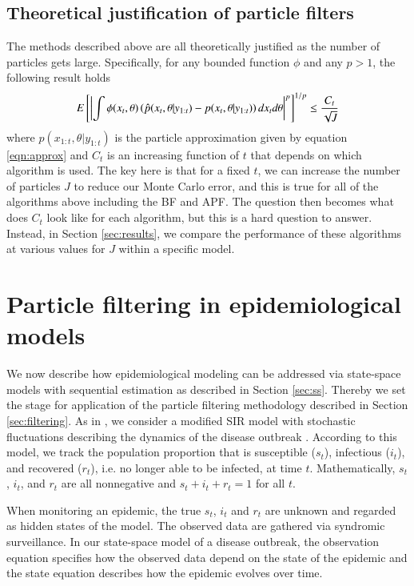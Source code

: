 \documentclass{elsarticle}
\begin{document}
\subsection{Theoretical justification of particle filters}

The methods described above are all theoretically justified as the number of particles gets large. Specifically, for any bounded function $\phi$ and any $p>1$, the following result holds
\[ E\left[ \left| \int \phi (x_{t}, \theta) \left(\hat{p}(x_{t},\theta|y_{1:t})-p(x_{t},\theta|y_{1:t})\right)\emph{d}x_t\emph{d}\theta\right|^p\right]^{1/p} \le \frac{C_t}{\sqrt{J}} \]
where $\hat{p}(x_{1:t},\theta|y_{1:t})$ is the particle approximation given by equation \eqref{eqn:approx} and $C_t$ is an increasing function of $t$ \cite[][see Sec 3.5.1]{del2004feynman} that depends on which algorithm is used. The key here is that for a fixed $t$, we can increase the number of particles $J$ to reduce our Monte Carlo error, and this is true for all of the algorithms above including the BF and APF. The question then becomes what does $C_t$ look like for each algorithm, but this is a hard question to answer. Instead, in Section \ref{sec:results}, we compare the performance of these algorithms at various values for $J$ within a specific model.

\section{Particle filtering in epidemiological models \label{sec:apply}}

We now describe how epidemiological modeling can be addressed via state-space models with sequential estimation as described in Section \ref{sec:ss}. Thereby we set the stage for application of the particle filtering methodology described in Section \ref{sec:filtering}. As in \citet{skvortsov2012monitoring}, we consider a modified SIR model with stochastic fluctuations describing the dynamics of the disease outbreak \citep{herwaarden1995stochepid, dangerfield2009stochepid, anderson2004sars}. According to this model, we track the population proportion that is susceptible ($s_t$), infectious ($i_t$), and recovered ($r_t$), i.e. no longer able to be infected, at time $t$. Mathematically, $s_t$, $i_t$, and $r_t$ are all nonnegative and $s_t + i_t + r_t = 1$ for all $t$.

When monitoring an epidemic, the true $s_t$, $i_t$ and $r_t$ are unknown and regarded as hidden states of the model. The observed data are gathered via syndromic surveillance. In our state-space model of a disease outbreak, the observation equation specifies how the observed data depend on the state of the epidemic and the state equation describes how the epidemic evolves over time.
\end{document}
